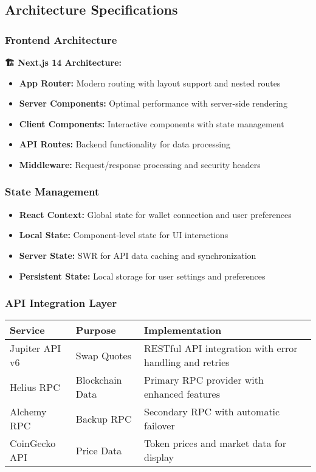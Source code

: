 \documentclass[12pt,a4paper]{article}
\begin{document}
\subsection{Architecture Specifications}

\subsubsection{Frontend Architecture}

\begin{tcolorbox}[colback=jupiterBlue!10,colframe=jupiterBlue]
\textbf{🏗️ Next.js 14 Architecture:}
\begin{itemize}
    \item \textbf{App Router:} Modern routing with layout support and nested routes
    \item \textbf{Server Components:} Optimal performance with server-side rendering
    \item \textbf{Client Components:} Interactive components with state management
    \item \textbf{API Routes:} Backend functionality for data processing
    \item \textbf{Middleware:} Request/response processing and security headers
\end{itemize}
\end{tcolorbox}

\subsubsection{State Management}

\begin{itemize}
    \item \textbf{React Context:} Global state for wallet connection and user preferences
    \item \textbf{Local State:} Component-level state for UI interactions
    \item \textbf{Server State:} SWR for API data caching and synchronization
    \item \textbf{Persistent State:} Local storage for user settings and preferences
\end{itemize}

\subsubsection{API Integration Layer}

\begin{longtable}{|p{3cm}|p{3cm}|p{7cm}|}
\hline
\textbf{Service} & \textbf{Purpose} & \textbf{Implementation} \\
\hline
\endhead

Jupiter API v6 & Swap Quotes & RESTful API integration with error handling and retries \\
\hline
Helius RPC & Blockchain Data & Primary RPC provider with enhanced features \\
\hline
Alchemy RPC & Backup RPC & Secondary RPC with automatic failover \\
\hline
CoinGecko API & Price Data & Token prices and market data for display \\
\hline
\end{longtable}
\end{document}
